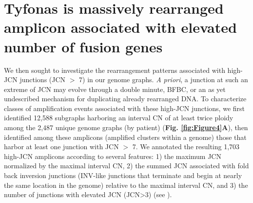 \documentclass[phd,tocprelim]{cornell}
\begin{document}


\section{Tyfonas is massively rearranged amplicon associated with elevated number of fusion genes}
We then sought to investigate the rearrangement patterns associated with high-JCN junctions (JCN $>$ 7) in our genome graphs.  \textit{A priori}, a junction at such an extreme of JCN may evolve through a double minute, BFBC, or an as yet undescribed mechanism for duplicating already rearranged DNA. To characterize classes of  amplification events associated with these high-JCN junctions, we first identified 12,588 subgraphs harboring an interval CN of at least twice ploidy among the 2,487 unique genome graphs (by patient) (\textbf{Fig. \ref{fig:Figure4}A}), then identified among these amplicons (amplified clusters within a genome) those that harbor at least one junction with JCN $>$ 7.  We annotated the resulting 1,703 high-JCN amplicons according to several features: 1) the maximum JCN normalized by the maximal interval CN, 2) the summed JCN associated with fold back inversion junctions (INV-like junctions that terminate and begin at nearly the same location in the genome) relative to the maximal interval CN, and 3) the number of junctions with elevated JCN (JCN>3) (see ).
\end{document}
